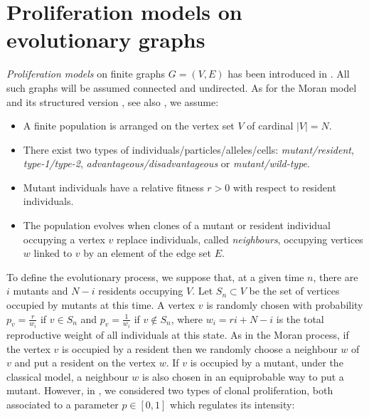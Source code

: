 \documentclass[a4paper,english,10pt]{amsart}
\theoremstyle{definition}
\numberwithin{equation}{section}
\begin{document}
\section{Proliferation models on evolutionary graphs}
\label{Sdef}

\emph{Proliferation models} on finite graphs $G=(V,E)$ has been introduced in \cite{AlcaldeGuerberoffLozano2022}. All such graphs will be assumed connected and undirected. As for the Moran model \cite{Moran} and its structured version \cite{LHN}, see also \cite{BR,BRS2,Maruyama1970,Maruyama1974,Nowak,SR2,Voorhees1}, we assume: 

\begin{itemize}

\item A finite population is arranged on the vertex
 set $V$ of cardinal $|V|= N$.

\item There exist two types of individuals/particles/alleles/cells: \emph{mutant/resident}, \emph{type-1/type-2}, \emph{advantageous/disadvantageous} or \emph{mutant/wild-type}. 

\item Mutant individuals have a relative fitness $r>0$ with respect to resident individuals. 

\item The population evolves when clones of a mutant or resident individual occupying a vertex $v$ replace individuals, called \emph{neighbours}, occupying vertices $w$ linked to $v$ by an element of the edge set $E$. 
\end{itemize}

\noindent
To define the evolutionary process, we suppose that, at a given time 
$n$, there are $i$ mutants and $N-i$ residents occupying $V$.  Let $S_n \subset V$ be the set of vertices occupied by mutants at this time. A vertex $v$ is randomly 
chosen with probability $p_v =\frac{r}{w_i}$ if $v \in S_n$ and $p_v = \frac{1}{w_i}$ if $v \notin S_n$, where $w_i = ri + N-i$ is the total reproductive weight of all individuals at this state.
As in the Moran process, if the vertex 
$v$ is occupied by a resident then we randomly choose a neighbour $w$ of $v$ and put a resident on the vertex $w$.
If $v$ is occupied by a mutant, under the classical 
model, a neighbour $w$ is also chosen in an equiprobable way to put a mutant. However, in \cite{AlcaldeGuerberoffLozano2022}, we considered two types of clonal proliferation, both associated to a parameter $p \in [0,1]$ which regulates its intensity: 
 
\end{document}
